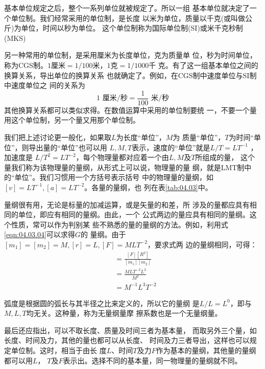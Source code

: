 基本单位规定之后，整个一系列单位就被规定了。所以一组
基本单位就决定了一个单位制。我们经常采用的单位制，是长度
以米为单位，质量以千克(或叫做公斤)为单位，时间以秒为单位。
这个单位制称为国际单位制(SI)或米千克秒制(MKS)

另一种常用的单位制，是采用厘米为长度单位，克为质量单
位，秒为时间单位，称为CGS制。$ 1 $厘米$ =1/100 $米，$ 1 $克$ =1/1000 $千
克。有了这一组基本单位之间的换算关系，导出单位的换算关系
也就确定了。例如，在CGS制中速度单位与SI制中速度单位之
间的关系为
\begin{equation*}
  1 \text{ 厘米/秒} = \frac { 1 } { 1 0 0 } \text{ 米/秒}
\end{equation*}
其他换算关系都可以类似求得。在数值运算中采用的单位制要统
\clearpage\noindent
一，不要一个量用这个单位制，另一个量又用那个单位制。

我们把上述讨论更一般化，如果取$ L $为长度“单位”，$ M $为
质量“单位”，$ T $为时间“单位”，则导出量的“单位”也可以用
$ L , M , T $表示，速度的“单位”就是$ L / T = L T ^ { - 1 } $ ，加速度是
$ L / T ^ { 2 } = L T ^ { - 2 } $，每个物理量都对应着一个由$ L , M $及$ T $所组成的量，
这个量我们称为该物理量的量纲，从形式上可以说，物理量的量
纲，就是LMT制中的“单位”。我们习惯用一个方括号表示括号
中的物理量的量纲，如$ [ v ] = L T ^ { - 1 } , [ a ] = L T ^ { - 2 }$。各量的量纲，也
列在表\ref{tab:04.03}中。

量纲很有用，无论是标量的加减运算，或是矢量的和差，所
涉及的量都应具有相同的单位，即应有相同的量纲。由此，一个
公式两边的量应具有相同的量纲。这个性质，常可以作为判别某
些不熟悉的量的量纲的方法。例如，利用式\eqref{eqn:04.03.04}可以求得$ G $的
量纲。由于$ [ m _ { 1 } ] = [ m _ { 2 } ] = M , [ r ] = L , [  F ] = M L T ^ { - 2 } $，要求式两
边的量纲相同，可得：
\begin{align*}
  [ G ] & = \frac { [ F ] [ R ^ 2] } { [ m _ { 1 } ] [ m _ { 2 } ] } \\
        & = \frac { M L T ^ { - 2 } L ^ { 2 } } { M ^ { 2 } }        \\
        & = M ^ { - 1 } L ^ { 3 } T ^ { - 2 }
\end{align*}

弧度是根据圆的弧长与其半径之比来定义的，所以它的量纲
是$ L / L = L ^ { 0 } $，即与$ M , L , T $均无关。这种量，称为无量纲量摩
擦系数也是一个无量纲量。

最后还应指出，可以不取长度、质量及时间三者为基本量，
而取另外三个量，如长度、时间及力，其他的量也都可以从长度、
时间及力三者导出，这样也可以规定单位制。这时，相当于由长
度$ L $、时间$ T $及力$ F $作为基本的量纲，其他量的量纲都可以用$ L $，
$ T $及$ F $表示出。选择不同的基本量，同一物理量的量纲就不同。
